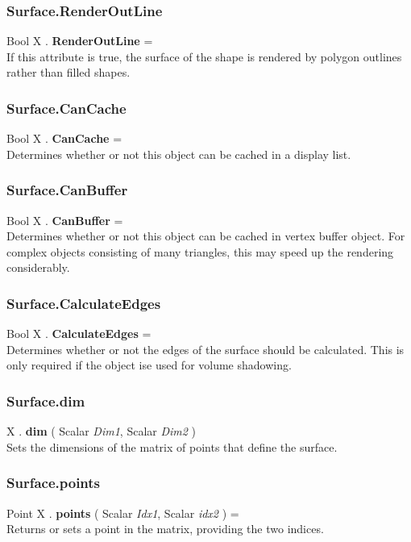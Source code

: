 \documentclass[10pt]{book}
\begin{document}
\subsubsection{Surface.RenderOutLine \label{F:Surface:RenderOutLine}}
Bool X . \textbf{RenderOutLine} = \\
If this attribute is true, the surface of the shape is rendered by polygon outlines rather than filled shapes.

\subsubsection{Surface.CanCache \label{F:Surface:CanCache}}
Bool X . \textbf{CanCache} = \\
Determines whether or not this object can be cached in a display list.

\subsubsection{Surface.CanBuffer \label{F:Surface:CanBuffer}}
Bool X . \textbf{CanBuffer} = \\
Determines whether or not this object can be cached in vertex buffer object. For complex objects consisting of many triangles, this may speed up the rendering considerably.

\subsubsection{Surface.CalculateEdges \label{F:Surface:CalculateEdges}}
Bool X . \textbf{CalculateEdges} = \\
Determines whether or not the edges of the surface should be calculated. This is only required if the object ise used for volume shadowing.

\subsubsection{Surface.dim \label{F:Surface:dim}}
X . \textbf{dim} ( Scalar \textit{Dim1}, Scalar \textit{Dim2} ) \\
Sets the dimensions of the matrix of points that define the surface.

\subsubsection{Surface.points \label{F:Surface:points}}
Point X . \textbf{points} ( Scalar \textit{Idx1}, Scalar \textit{idx2} ) = \\
Returns or sets a point in the matrix, providing the two indices.
\end{document}
